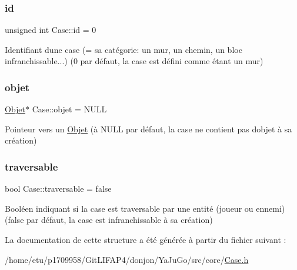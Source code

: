 \subsubsection{\texorpdfstring{id}{id}}
{\footnotesize\ttfamily unsigned int Case\+::id = 0}

Identifiant d\textquotesingle{}une case (= sa catégorie\+: un mur, un chemin, un bloc infranchissable...) (0 par défaut, la case est défini comme étant un mur) \mbox{\label{structCase_a182f9c3f43cf1a8aa3391cca353028b5}} 
\subsubsection{\texorpdfstring{objet}{objet}}
{\footnotesize\ttfamily \mbox{\hyperlink{structObjet}{Objet}}$\ast$ Case\+::objet = N\+U\+LL}

Pointeur vers un \mbox{\hyperlink{structObjet}{Objet}} (à N\+U\+LL par défaut, la case ne contient pas d\textquotesingle{}objet à sa création) \mbox{\label{structCase_a4e8e7bff6969ebe1b726d124da5ea2a9}} 
\subsubsection{\texorpdfstring{traversable}{traversable}}
{\footnotesize\ttfamily bool Case\+::traversable = false}

Booléen indiquant si la case est traversable par une entité (joueur ou ennemi) (false par défaut, la case est infranchissable à sa création) 

La documentation de cette structure a été générée à partir du fichier suivant \+:\begin{DoxyCompactItemize}
\item 
/home/etu/p1709958/\+Git\+L\+I\+F\+A\+P4/donjon/\+Ya\+Ju\+Go/src/core/\mbox{\hyperlink{Case_8h}{Case.\+h}}\end{DoxyCompactItemize}
